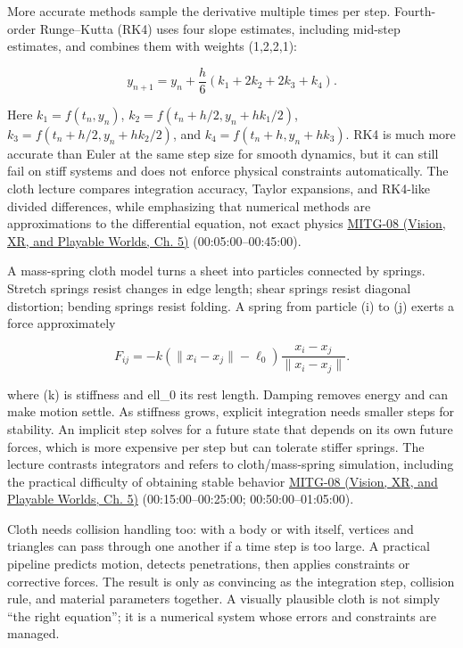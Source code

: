 More accurate methods sample the derivative multiple times per step. Fourth-order Runge--Kutta (RK4) uses four slope estimates, including mid-step estimates, and combines them with weights (1,2,2,1):

\[
y_{n+1}=y_n+\frac{h}{6}(k_1+2k_2+2k_3+k_4).
\]

Here \(k_1=f(t_n,y_n)\), \(k_2=f(t_n+h/2,y_n+hk_1/2)\), \(k_3=f(t_n+h/2,y_n+hk_2/2)\), and \(k_4=f(t_n+h,y_n+hk_3)\). RK4 is much more accurate than Euler at the same step size for smooth dynamics, but it can still fail on stiff systems and does not enforce physical constraints automatically. The cloth lecture compares integration accuracy, Taylor expansions, and RK4-like divided differences, while emphasizing that numerical methods are approximations to the differential equation, not exact physics \href{../07-Vision-XR-and-Playable-Worlds/main.pdf\#nameddest=04-visual-computing-ii-ch036-mitg-08---cloth-simulation}{MITG-08 (Vision, XR, and Playable Worlds, Ch. 5)} (00:05:00--00:45:00).

A mass-spring cloth model turns a sheet into particles connected by springs. Stretch springs resist changes in edge length; shear springs resist diagonal distortion; bending springs resist folding. A spring from particle (i) to (j) exerts a force approximately

\[
F_{ij}=-k(\|x_i-x_j\|-\ell_0)\frac{x_i-x_j}{\|x_i-x_j\|}.
\]

where (k) is stiffness and ell\_0 its rest length. Damping removes energy and can make motion settle. As stiffness grows, explicit integration needs smaller steps for stability. An implicit step solves for a future state that depends on its own future forces, which is more expensive per step but can tolerate stiffer springs. The lecture contrasts integrators and refers to cloth/mass-spring simulation, including the practical difficulty of obtaining stable behavior \href{../07-Vision-XR-and-Playable-Worlds/main.pdf\#nameddest=04-visual-computing-ii-ch036-mitg-08---cloth-simulation}{MITG-08 (Vision, XR, and Playable Worlds, Ch. 5)} (00:15:00--00:25:00; 00:50:00--01:05:00).

Cloth needs collision handling too: with a body or with itself, vertices and triangles can pass through one another if a time step is too large. A practical pipeline predicts motion, detects penetrations, then applies constraints or corrective forces. The result is only as convincing as the integration step, collision rule, and material parameters together. A visually plausible cloth is not simply ``the right equation''; it is a numerical system whose errors and constraints are managed.

